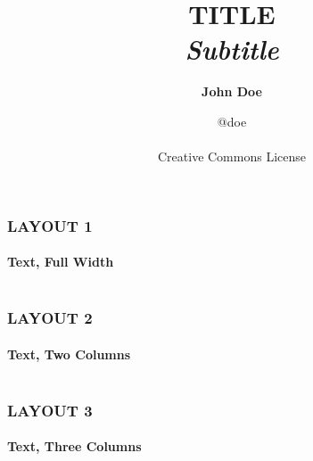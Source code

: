 \documentclass[14 pt]{beamer}
\title[Short-title]{TITLE\\ \vskip1cm \fontspec{Crimson Text}
\textit{Subtitle}}
\author{\textbf{John Doe}}
\date{@doe\\ \vskip4cm \ccbyncnd \\ Creative Commons License}
\begin{document}

%
%


\begin{frame}
\titlepage
\end{frame}


\begin{frame}[t]
\frametitle{LAYOUT 1}
\framesubtitle{Text, Full Width}

\begin{columns}[t]
\begin{column}{0.96\textwidth}
\lipsum[1]
\vskip0.5cm%
\lipsum[2]
\vskip0.5cm%
\lipsum[4]
\end{column}
\end{columns}
\end{frame}


\begin{frame}[t]
\frametitle{LAYOUT 2}
\framesubtitle{Text, Two Columns}
\begin{columns}[t]
\begin{column}{0.45\textwidth}
\lipsum[3]
\vskip0.5cm%
\lipsum[4]
\end{column}
\begin{column}{0.45\textwidth}
\lipsum[5]
\vskip0.5cm%
\lipsum[6]
\end{column}
\end{columns}
\end{frame}


\begin{frame}[t]
\frametitle{LAYOUT 3}
\framesubtitle{Text, Three Columns}
\begin{columns}[t]
\begin{column}{0.30\textwidth}
\lipsum[3]
\end{column}
\begin{column}{0.30\textwidth}
\lipsum[5]
\end{column}
\begin{column}{0.30\textwidth}
\lipsum[3]
\end{column}
\end{columns}
\end{frame}
\end{document}
